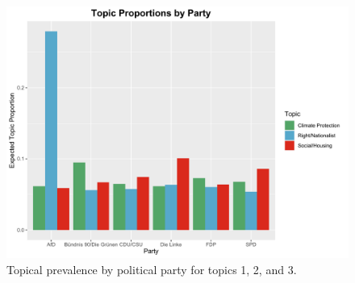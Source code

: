 \begin{figure}[h!]
  \centering
  \captionsetup{justification=centering,margin=2cm}
  \includegraphics[scale = 0.5]{../plots/appendix/4_6/beta_t146_cat_ctm.pdf}
  \caption{Topical prevalence by political party for topics 1, 2, and 3.}
  \label{fig:beta_t146_cat_ctm}
\end{figure}